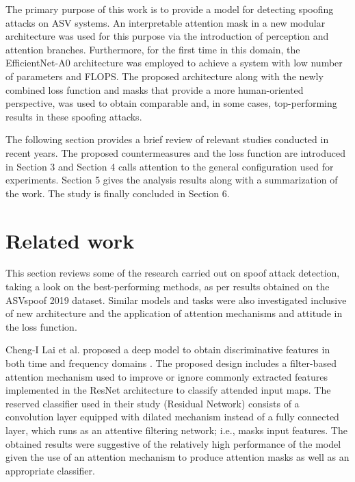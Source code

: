 \documentclass[a4paper]{article}
\begin{document}
The primary purpose of this work is to provide a model for detecting spoofing attacks on ASV systems. An interpretable attention mask in a new modular architecture was used for this purpose via the introduction of perception and attention branches. Furthermore, for the first time in this domain, the EfficientNet-A0 \cite{21rostami2020efficientnet} architecture was employed to achieve a system with low number of parameters and FLOPS. The proposed architecture along with the newly combined loss function and masks that provide a more human-oriented perspective, was used to obtain comparable and, in some cases, top-performing results in these spoofing attacks. 

The following section provides a brief review of relevant studies conducted in recent years. The proposed countermeasures and the loss function are introduced in Section 3 and Section 4 calls attention to the general configuration used for experiments. Section 5 gives the analysis results along with a summarization of the work. The study is finally concluded in Section 6.
\section{Related work}

This section reviews some of the research carried out on spoof attack detection, taking a look on the best-performing methods, as per results obtained on the ASVspoof 2019 dataset. Similar models and tasks were also investigated inclusive of new architecture and the application of attention mechanisms and attitude in the loss function.

Cheng-I Lai et al. proposed a deep model to obtain discriminative features in both time and frequency domains \cite{22lai2019attentive}. The proposed design includes a filter-based attention mechanism used to improve or ignore commonly extracted features implemented in the ResNet architecture to classify attended input maps. The reserved classifier used in their study (Residual Network) consists of a convolution layer equipped with dilated mechanism instead of a fully connected layer, which runs as an attentive filtering network; i.e., masks input features. The obtained results were suggestive of the relatively high performance of the model given the use of an attention mechanism to produce attention masks as well as an appropriate classifier.
\end{document}
